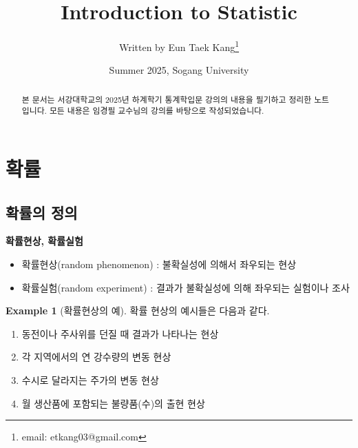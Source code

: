 \documentclass{article}
\title{\textsf{Introduction to Statistic}}
\author[1]{Written by Eun Taek Kang\thanks{email: etkang03@gmail.com}}
\affil[1]{Department of Physics, Sogang University, Seoul 04107, Korea}
\date{Summer 2025, Sogang University}
\theoremstyle{definition}
\newtheorem{example}[theorem]{Example}
\begin{document}
\pagestyle{fancy}
    \fancyhf{}
    \fancyfoot[C]{\thepage}

\maketitle

\begin{abstract}
    본 문서는 서강대학교의 2025년 하계학기 통계학입문 강의의 내용을 필기하고 정리한 노트입니다. 모든 내용은 임경필 교수님의 강의를 바탕으로 작성되었습니다.
\end{abstract}

\newpage

\section{확률}

\subsection{확률의 정의}

\textbf{확률현상, 확률실험}

\begin{itemize}
    \item 확률현상(random phenomenon) : 불확실성에 의해서 좌우되는 현상
    \item 확률실험(random experiment) : 결과가 불확실성에 의해 좌우되는 실험이나 조사
\end{itemize}

\begin{example}[확률현상의 예]
    확률 현상의 예시들은 다음과 같다.

    \begin{enumerate}
        \item 동전이나 주사위를 던질 때 결과가 나타나는 현상
        \item 각 지역에서의 연 강수량의 변동 현상
        \item 수시로 달라지는 주가의 변동 현상
        \item 월 생산품에 포함되는 불량품(수)의 출현 현상
    \end{enumerate}
\end{example}
\end{document}
